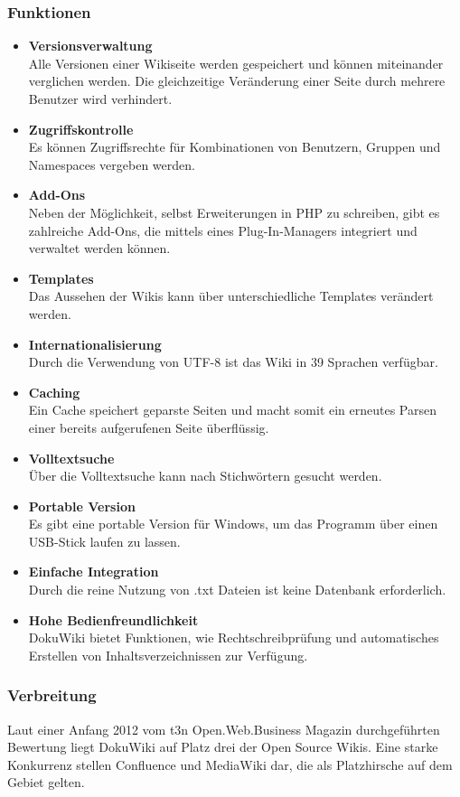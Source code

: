\subsubsection*{Funktionen}
\begin{itemize}
\item \textbf{Versionsverwaltung}
\\
Alle Versionen einer Wikiseite werden gespeichert und können miteinander verglichen werden. Die gleichzeitige Veränderung einer Seite durch mehrere Benutzer wird verhindert.
\item \textbf{Zugriffskontrolle}
\\
Es können Zugriffsrechte für Kombinationen von Benutzern, Gruppen und Namespaces vergeben werden.
\item \textbf{Add-Ons}
\\
Neben der Möglichkeit, selbst Erweiterungen in PHP zu schreiben, gibt es zahlreiche Add-Ons, die mittels eines Plug-In-Managers integriert und verwaltet werden können.
\item \textbf{Templates}
\\
Das Aussehen der Wikis kann über unterschiedliche Templates verändert werden.
\item \textbf{Internationalisierung}
\\
Durch die Verwendung von UTF-8 ist das Wiki in 39 Sprachen verfügbar.
\item \textbf{Caching}
\\
Ein Cache speichert geparste Seiten und macht somit ein erneutes Parsen einer bereits aufgerufenen Seite überflüssig.
\item \textbf{Volltextsuche}
\\
Über die Volltextsuche kann nach Stichwörtern gesucht werden.
\item \textbf{Portable Version}
\\
Es gibt eine portable Version für Windows, um das Programm über einen USB-Stick laufen zu lassen.
\item \textbf{Einfache Integration}
\\
Durch die reine Nutzung von .txt Dateien ist keine Datenbank erforderlich.
\item \textbf{Hohe Bedienfreundlichkeit}
\\
DokuWiki bietet Funktionen, wie Rechtschreibprüfung und automatisches Erstellen von Inhaltsverzeichnissen zur Verfügung.
\end{itemize}

\subsubsection*{Verbreitung}
Laut einer Anfang 2012 vom t3n Open.Web.Business Magazin durchgeführten Bewertung liegt DokuWiki auf Platz drei der Open Source Wikis. Eine starke Konkurrenz stellen Confluence und MediaWiki dar, die als Platzhirsche auf dem Gebiet gelten.
